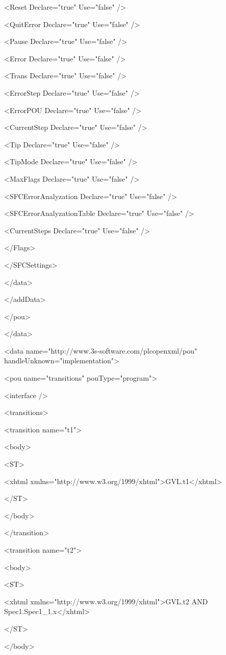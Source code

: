    <Reset Declare="true" Use="false" />

   <QuitError Declare="true" Use="false" />

   <Pause Declare="true" Use="false" />

   <Error Declare="true" Use="false" />

   <Trans Declare="true" Use="false" />

   <ErrorStep Declare="true" Use="false" />

   <ErrorPOU Declare="true" Use="false" />

   <CurrentStep Declare="true" Use="false" />

   <Tip Declare="true" Use="false" />

   <TipMode Declare="true" Use="false" />

   <MaxFlags Declare="true" Use="false" />

   <SFCErrorAnalyzation Declare="true" Use="false" />

   <SFCErrorAnalyzationTable Declare="true" Use="false" />

   <CurrentSteps Declare="true" Use="false" />

  </Flags>

 </SFCSettings>

</data>

</addData>

</pou>

</data>

<data name="http://www.3s-software.com/plcopenxml/pou" handleUnknown="implementation">

<pou name="transitions" pouType="program">

<interface />

<transitions>

<transition name="t1">

 <body>

  <ST>

   <xhtml xmlns="http://www.w3.org/1999/xhtml">GVL.t1</xhtml>

  </ST>

 </body>

</transition>

<transition name="t2">

 <body>

  <ST>

   <xhtml xmlns="http://www.w3.org/1999/xhtml">GVL.t2 AND Spec1.Spec1\_1.x</xhtml>

  </ST>

 </body>

